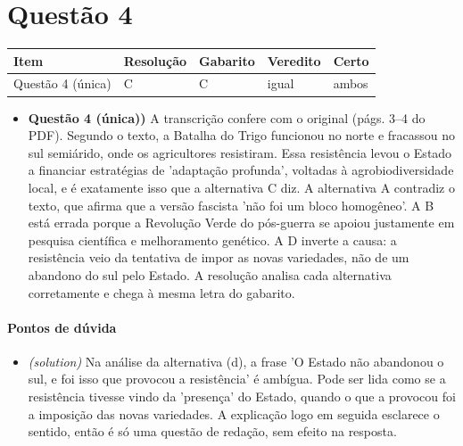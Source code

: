 \documentclass{article}%
\begin{document}
\section*{Questão 4}%
\begin{longtable}{@{}p{} p{} p{} p{} p{}@{}}\toprule Item & Resolução & Gabarito & Veredito & Certo \\ \midrule
Questão 4 (única) & C & C & igual & ambos \\
\bottomrule\end{longtable}%
\begin{itemize}%
\item%
\textbf{Questão 4 (única))} A transcrição confere com o original (págs. 3--4 do PDF). Segundo o texto, a Batalha do Trigo funcionou no norte e fracassou no sul semiárido, onde os agricultores resistiram. Essa resistência levou o Estado a financiar estratégias de 'adaptação profunda', voltadas à agrobiodiversidade local, e é exatamente isso que a alternativa C diz. A alternativa A contradiz o texto, que afirma que a versão fascista 'não foi um bloco homogêneo'. A B está errada porque a Revolução Verde do pós{-}guerra se apoiou justamente em pesquisa científica e melhoramento genético. A D inverte a causa: a resistência veio da tentativa de impor as novas variedades, não de um abandono do sul pelo Estado. A resolução analisa cada alternativa corretamente e chega à mesma letra do gabarito.%
\end{itemize}%
\paragraph{Pontos de dúvida}%
\begin{itemize}%
\item%
\textit{(solution)} Na análise da alternativa (d), a frase 'O Estado não abandonou o sul, e foi isso que provocou a resistência' é ambígua. Pode ser lida como se a resistência tivesse vindo da 'presença' do Estado, quando o que a provocou foi a imposição das novas variedades. A explicação logo em seguida esclarece o sentido, então é só uma questão de redação, sem efeito na resposta.%
\end{itemize}%
\end{document}
